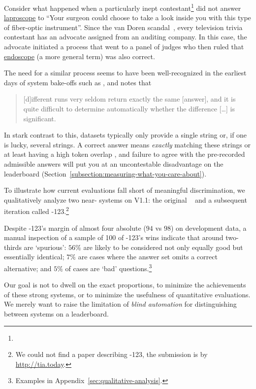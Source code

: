Consider what happened 
when a particularly inept \jeopardy{} contestant\footnote{} did not answer \underline{laproscope} to ``Your surgeon could choose to take a look inside you with this type of fiber-optic instrument''.
Since the van Doren scandal~\cite{freedman-97}, every television trivia contestant has an advocate assigned from an
auditing company.
In this case, the advocate initiated a process that went to a panel of judges who then
ruled that \underline{endoscope} (a more general term) was also correct.

The need for a similar process seems to have been well-recognized
in the earliest days of \qa{} system bake-offs such as , and  notes that
\begin{quote}
    [d]ifferent  runs very seldom return exactly the same [answer], and it is quite difficult to determine automatically whether the difference [\dots] is significant.
\end{quote} 
In stark contrast to this, \qa{} datasets typically only provide a single string or, if one is lucky,
several strings.  
A correct answer means \emph{exactly} matching these strings or at least
having a high token overlap \fone{}, and failure to agree with the
pre-recorded admissible answers will put you at an uncontestable
disadvantage on the leaderboard (Section~\ref{subsection:measuring-what-you-care-about}).  

To illustrate how current evaluations fall short of meaningful
discrimination, we qualitatively analyze two near-\sota{} systems on
\squad{} V1.1: the original \xlnet{}~\citep{yang-19} and a subsequent
iteration called \xlnet{}-123.\footnote{We could not find a paper
  describing \xlnet{}-123, the submission is by
  \url{http://tia.today}.}

Despite \xlnet{}-123's margin of almost four absolute \fone{} ($94$ vs
$98$) on development data, a manual inspection of a sample of 100 of
\xlnet{}-123's wins indicate that around two-thirds are `spurious':
$56\%$ are likely to be considered not only equally good but
essentially identical; $7\%$ are cases where the answer set omits a
correct alternative; and $5\%$ of cases are `bad'
questions.\footnote{Examples in
  Appendix~\ref{sec:qualitative-analysis}.}

Our goal is not to dwell on the exact proportions, to minimize the achievements of these strong systems, or to minimize the usefulness of quantitative evaluations.
We merely want to raise the limitation of \emph{blind automation} for distinguishing between
systems on a leaderboard. 

